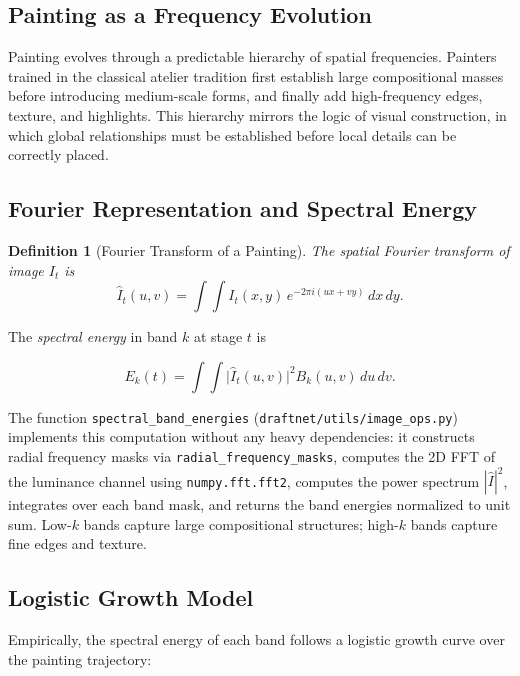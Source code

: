 \documentclass[12pt,a4paper]{article}
\theoremstyle{draftthm}
\newtheorem{definition}{Definition}[section]
\newcommand{\code}[1]{\texttt{\small #1}}
\begin{document}
\subsection{Painting as a Frequency Evolution}

Painting evolves through a predictable hierarchy of spatial frequencies. Painters trained in the classical atelier tradition first establish large compositional masses before introducing medium-scale forms, and finally add high-frequency edges, texture, and highlights. This hierarchy mirrors the logic of visual construction, in which global relationships must be established before local details can be correctly placed.

\subsection{Fourier Representation and Spectral Energy}

\begin{definition}[Fourier Transform of a Painting]
  The spatial Fourier transform of image $I_t$ is
  \begin{equation}
    \hat{I}_t(u,v) = \int\!\!\int I_t(x,y)\, e^{-2\pi i(ux+vy)}\, dx\, dy.
  \end{equation}
\end{definition}

The \emph{spectral energy} in band $k$ at stage $t$ is

\begin{equation}
  E_k(t) = \int\!\!\int \bigl|\hat{I}_t(u,v)\bigr|^2 B_k(u,v)\, du\, dv.
  \label{eq:spectral-energy}
\end{equation}

The function \code{spectral\_band\_energies} (\code{draftnet/utils/image\_ops.py}) implements this computation without any heavy dependencies: it constructs radial frequency masks via \code{radial\_frequency\_masks}, computes the 2D FFT of the luminance channel using \code{numpy.fft.fft2}, computes the power spectrum $|\hat{I}|^2$, integrates over each band mask, and returns the band energies normalized to unit sum. Low-$k$ bands capture large compositional structures; high-$k$ bands capture fine edges and texture.

\subsection{Logistic Growth Model}

Empirically, the spectral energy of each band follows a logistic growth curve over the painting trajectory:
\end{document}
